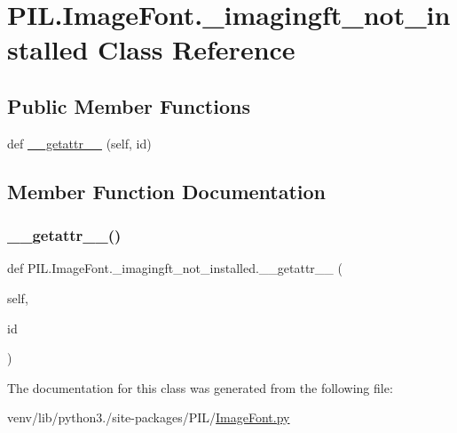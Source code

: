 \hypertarget{classPIL_1_1ImageFont_1_1__imagingft__not__installed}{}\section{P\+I\+L.\+Image\+Font.\+\_\+imagingft\+\_\+not\+\_\+installed Class Reference}
\label{classPIL_1_1ImageFont_1_1__imagingft__not__installed}
\subsection*{Public Member Functions}
\begin{DoxyCompactItemize}
\item 
def \hyperlink{classPIL_1_1ImageFont_1_1__imagingft__not__installed_abeca312ee66a8b82ca195bc213e7d14a}{\+\_\+\+\_\+getattr\+\_\+\+\_\+} (self, id)
\end{DoxyCompactItemize}


\subsection{Member Function Documentation}
\mbox{\label{classPIL_1_1ImageFont_1_1__imagingft__not__installed_abeca312ee66a8b82ca195bc213e7d14a}} 
\subsubsection{\texorpdfstring{\+\_\+\+\_\+getattr\+\_\+\+\_\+()}{\_\_getattr\_\_()}}
{\footnotesize\ttfamily def P\+I\+L.\+Image\+Font.\+\_\+imagingft\+\_\+not\+\_\+installed.\+\_\+\+\_\+getattr\+\_\+\+\_\+ (\begin{DoxyParamCaption}\item[{}]{self,  }\item[{}]{id }\end{DoxyParamCaption})}



The documentation for this class was generated from the following file\+:\begin{DoxyCompactItemize}
\item 
venv/lib/python3./site-\/packages/\+P\+I\+L/\hyperlink{ImageFont_8py}{Image\+Font.\+py}\end{DoxyCompactItemize}
